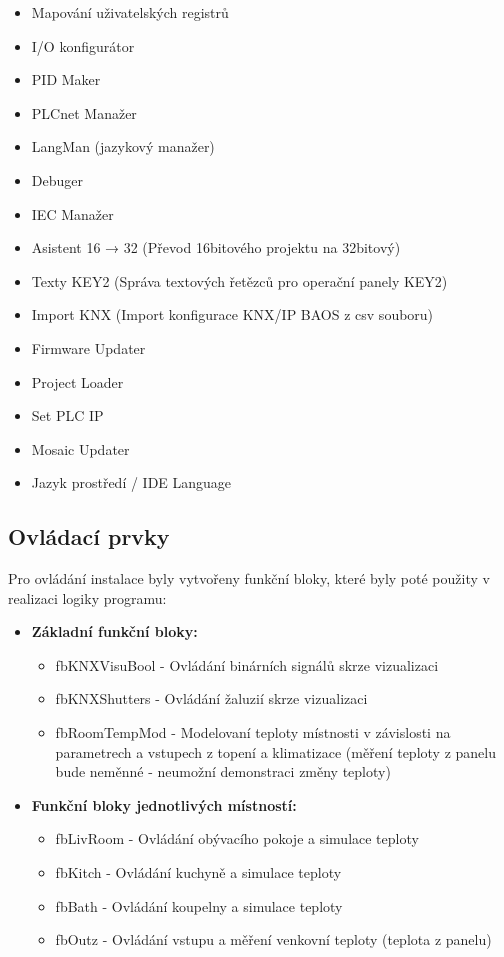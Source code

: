 \begin{itemize}
\begin{itemize}
        \item Mapování uživatelských registrů
        \item I/O konfigurátor
        \item PID Maker
        \item PLCnet Manažer
        \item LangMan (jazykový manažer)
        \item Debuger
        \item IEC Manažer
        \item Asistent 16 → 32 (Převod 16bitového projektu na 32bitový)
        \item Texty KEY2 (Správa textových řetězců pro operační panely KEY2)
        \item Import KNX (Import konfigurace KNX/IP BAOS z csv souboru)
        \item Firmware Updater
        \item Project Loader
        \item Set PLC IP
        \item Mosaic Updater
        \item Jazyk prostředí / IDE Language
    \end{itemize}
\end{itemize}

\subsection{Ovládací prvky}
Pro ovládání instalace byly vytvořeny funkční bloky, které byly poté použity v realizaci logiky programu:

\begin{itemize}
    \item \textbf{Základní funkční bloky:}
        \begin{itemize}
            \item fbKNXVisuBool - Ovládání binárních signálů skrze vizualizaci
            \item fbKNXShutters - Ovládání žaluzií skrze vizualizaci
            \item fbRoomTempMod - Modelovaní teploty místnosti v závislosti na parametrech a vstupech z topení a klimatizace (měření teploty z panelu bude neměnné - neumožní demonstraci změny teploty)
        \end{itemize}
    \item \textbf{Funkční bloky jednotlivých místností:}
        \begin{itemize}
            \item fbLivRoom - Ovládání obývacího pokoje a simulace teploty
            \item fbKitch - Ovládání kuchyně a simulace teploty
            \item fbBath - Ovládání koupelny a simulace teploty
            \item fbOutz - Ovládání vstupu a měření venkovní teploty (teplota z panelu) \newline
        \end{itemize}
\end{itemize}

